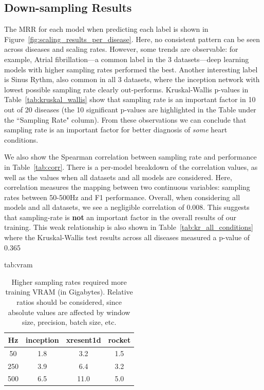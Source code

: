 \documentclass[pmlr,twocolumn]{jmlr}%
\begin{document}
\subsection{Down-sampling Results}
\label{sec:ds_results}
The MRR for each model when predicting each label is shown in Figure~\ref{fig:scaling_results_per_disease}. Here, no consistent pattern can be seen across diseases and scaling rates. However, some trends are observable: for example, Atrial fibrillation---a common label in the 3 datasets---deep learning models with higher sampling rates performed the best. Another interesting label is Sinus Rythm, also common in all 3 datasets,  where the inception network with lowest possible sampling rate clearly out-performs. Kruskal-Wallis p-values in Table~\ref{tab:kruskal_wallis} show that sampling rate is an important factor in 10 out of 20 diseases (the 10 significant p-values are highlighted in the Table under the ``Sampling Rate" column). From these observations we can conclude that sampling rate is an important factor for better diagnosis of \textit{some} heart conditions.

We also show the Spearman correlation between sampling rate and performance in Table~\ref{tab:corr}. There is a per-model breakdown of the correlation values, as well as the values when all datasets and all models are considered. Here, correlation measures the mapping between two continuous variables: sampling rates between 50-500Hz and F1 performance. Overall, when considering all models and all datasets, we see a negligible correlation of $0.008$. This suggests that sampling-rate is \textbf{not} an important factor in the overall results of our training. This weak relationship is also shown in   Table~\ref{tab:kr_all_conditions} where the Kruskal-Wallis test results across all diseases measured a p-value of 0.365
\begin{table}[htbp]
\centering
\floatconts
  {tab:vram}
  {\caption{Higher sampling rates required more training VRAM (in Gigabytes). Relative ratios should be considered, since absolute values are affected by window size, precision, batch size, etc.}}
  {\begin{tabular}{|c|c|c|c|}
  \hline
    \bfseries Hz & \bfseries inception & \bfseries xresent1d & \bfseries rocket\\
  \hline
    50  & 1.8       & 3.2     & 1.5    \\
    250 & 3.9       & 6.4     & 3.2    \\
    500 & 6.5       & 11.0    & 5.0   \\
  \hline
  \end{tabular}}
\end{table}
\end{document}
